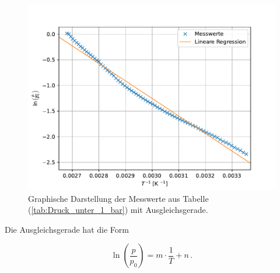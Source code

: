     \begin{figure}[H]
      \centering
      \includegraphics[width=0.977\linewidth]{plot1.pdf}
      \caption{Graphische Darstellung der Messwerte aus Tabelle (\ref{tab:Druck_unter_1_bar}) mit Ausgleichsgerade.}
      \label{fig:Druck_unter_1_bar}
    \end{figure}
    Die Ausgleichsgerade hat die Form 

    \begin{equation}
      \label{eqn:Ausgleichsgerade}
      \ln{\left(\frac{p}{p_0}\right)} = m \cdot \frac{1}{T} + n \, . 
    \end{equation}

